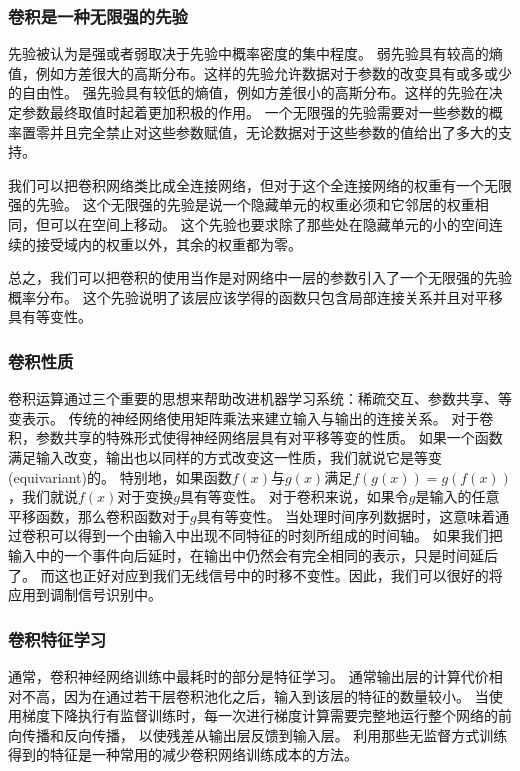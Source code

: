 \subsubsection{卷积是一种无限强的先验}
先验被认为是强或者弱取决于先验中概率密度的集中程度。
弱先验具有较高的熵值，例如方差很大的高斯分布。这样的先验允许数据对于参数的改变具有或多或少的自由性。
强先验具有较低的熵值，例如方差很小的高斯分布。这样的先验在决定参数最终取值时起着更加积极的作用。
一个无限强的先验需要对一些参数的概率置零并且完全禁止对这些参数赋值，无论数据对于这些参数的值给出了多大的支持。\par
我们可以把卷积网络类比成全连接网络，但对于这个全连接网络的权重有一个无限强的先验。
这个无限强的先验是说一个隐藏单元的权重必须和它邻居的权重相同，但可以在空间上移动。
这个先验也要求除了那些处在隐藏单元的小的空间连续的接受域内的权重以外，其余的权重都为零。\par
总之，我们可以把卷积的使用当作是对网络中一层的参数引入了一个无限强的先验概率分布。
这个先验说明了该层应该学得的函数只包含局部连接关系并且对平移具有等变性。
\subsubsection{卷积性质}
卷积运算通过三个重要的思想来帮助改进机器学习系统：稀疏交互、参数共享、等变表示。
传统的神经网络使用矩阵乘法来建立输入与输出的连接关系。
对于卷积，参数共享的特殊形式使得神经网络层具有对平移等变的性质。
如果一个函数满足输入改变，输出也以同样的方式改变这一性质，我们就说它是等变(equivariant)的。
特别地，如果函数$f(x)$与$g(x)$满足$f(g(x))= g(f(x))$，我们就说$f(x)$对于变换$g$具有等变性。
对于卷积来说，如果令$g$是输入的任意平移函数，那么卷积函数对于$g$具有等变性。
当处理时间序列数据时，这意味着通过卷积可以得到一个由输入中出现不同特征的时刻所组成的时间轴。
如果我们把输入中的一个事件向后延时，在输出中仍然会有完全相同的表示，只是时间延后了。
而这也正好对应到我们无线信号中的时移不变性。因此，我们可以很好的将\label{con_net}应用到调制信号识别中。\par
\subsubsection{卷积特征学习}
通常，卷积神经网络训练中最耗时的部分是特征学习。 
通常输出层的计算代价相对不高，因为在通过若干层卷积池化之后，输入到该层的特征的数量较小。
当使用梯度下降执行有监督训练时，每一次进行梯度计算需要完整地运行整个网络的前向传播和反向传播，
以使残差从输出层反馈到输入层。
利用那些无监督方式训练得到的特征是一种常用的减少卷积网络训练成本的方法。\par

